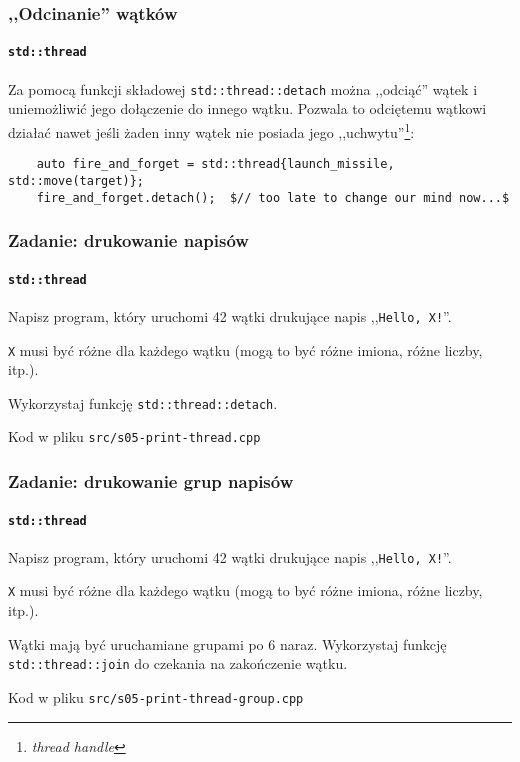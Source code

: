 \documentclass[aspectratio=169]{beamer}
\begin{document}
\begin{frame}[fragile]
    \frametitle{,,Odcinanie'' wątków}
    \framesubtitle{\texttt{std::thread}}

    Za pomocą funkcji składowej \texttt{std::thread::detach} można ,,odciąć''
    wątek i uniemożliwić jego dołączenie do innego wątku. Pozwala to odciętemu
    wątkowi działać nawet jeśli żaden inny wątek nie posiada jego
    ,,uchwytu''\footnote{\emph{thread handle}}:

    \vspace{1em}

    {\scriptsize
    \begin{lstlisting}
    auto fire_and_forget = std::thread{launch_missile, std::move(target)};
    fire_and_forget.detach();  $// too late to change our mind now...$
    \end{lstlisting}}
\end{frame}

\begin{frame}
    \frametitle{Zadanie: drukowanie napisów}
    \framesubtitle{\texttt{std::thread}}
    \label{lecture_exercise_0}

    Napisz program, który uruchomi 42 wątki drukujące napis ,,\texttt{Hello,
    X!}''.

    \texttt{X} musi być różne dla każdego wątku (mogą to być różne imiona, różne
    liczby, itp.).

    Wykorzystaj funkcję \texttt{std::thread::detach}.

    \vspace{1em}

    Kod w pliku \texttt{src/s05-print-thread.cpp}
\end{frame}

\begin{frame}
    \frametitle{Zadanie: drukowanie grup napisów}
    \framesubtitle{\texttt{std::thread}}
    \label{lecture_exercise_1}

    Napisz program, który uruchomi 42 wątki drukujące napis ,,\texttt{Hello,
    X!}''.

    \texttt{X} musi być różne dla każdego wątku (mogą to być różne imiona, różne
    liczby, itp.).

    Wątki mają być uruchamiane grupami po 6 naraz. Wykorzystaj funkcję
    \texttt{std::thread::join} do czekania na zakończenie wątku.

    \vspace{1em}

    Kod w pliku \texttt{src/s05-print-thread-group.cpp}
\end{frame}
\end{document}
